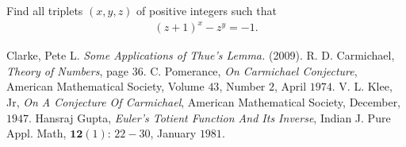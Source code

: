 \documentclass{subfile}
\begin{document}
	\begin{problem} %
		Find all triplets $ (x,y,z)$ of positive integers such that
			\begin{align*}
				(z+1)^x-z^y=-1.
			\end{align*}
	\end{problem}


	\begin{thebibliography}{99}
		 Clarke, Pete L. \textit{Some Applications of Thue's Lemma.} (2009).
		 R. D. Carmichael, \textit{Theory of Numbers}, page $36$.
		 C. Pomerance, \textit{On Carmichael Conjecture}, American Mathematical Society, Volume $43$, Number $2$, April $1974$.
		 V. L. Klee, Jr, \textit{On A Conjecture Of Carmichael}, American Mathematical Society, December, $1947$.
		 Hansraj Gupta, \textit{Euler's Totient Function And Its Inverse}, Indian J. Pure Appl. Math, $\mathbf{12}(1)$: $22-30$, January $1981$.
	\end{thebibliography}
\end{document}
